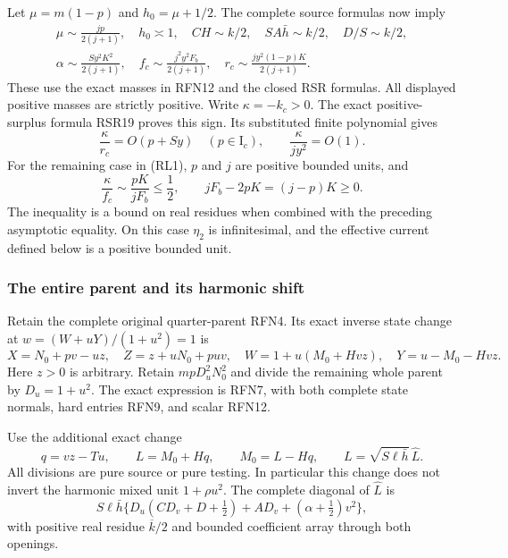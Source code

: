 Let \(\mu=m(1-p)\) and \(h_0=\mu+1/2\).
The complete source formulas now imply
\[
\begin{gathered}
 \mu\sim\frac{jp}{2(j+1)},\quad h_0\asymp1,\quad
 CH\sim k/2,\quad SA\bar h\sim k/2,\quad D/S\sim k/2,\\
 \alpha\sim\frac{Sy^2K^2}{2(j+1)},\quad
 f_c\sim\frac{j^2y^2F_b}{2(j+1)},\quad
 r_c\sim\frac{jy^2(1-p)K}{2(j+1)} .
\end{gathered}                                                   \tag{RL7}
\]
These use the exact masses in RFN12 and the closed RSR formulas.
All displayed positive masses are strictly positive.
Write \(\kappa=-k_c>0\).  The exact positive-surplus formula
RSR19 proves this sign.  Its substituted finite polynomial gives
\[
 \frac{\kappa}{r_c}=O(p+Sy)\quad(p\in\mathrm I_c),\qquad
 \frac{\kappa}{jy^2}=O(1).                              \tag{RL8}
\]
For the remaining case in (RL1), \(p\) and \(j\) are positive
bounded units, and
\[
 \frac{\kappa}{f_c}\sim\frac{pK}{jF_b}\leq\frac12,
 \qquad jF_b-2pK=(j-p)K\geq0.                          \tag{RL9}
\]
The inequality is a bound on real residues when combined with
the preceding asymptotic equality.  On this case \(\eta_2\) is
infinitesimal, and the effective current defined below is a
positive bounded unit.

\subsubsection*{The entire parent and its harmonic shift}

Retain the complete original quarter-parent RFN4.  Its exact inverse
state change at \(w=(W+uY)/(1+u^2)=1\) is
\[
 X=N_0+pv-uz,\quad Z=z+uN_0+puv,\quad
 W=1+u(M_0+Hvz),\quad Y=u-M_0-Hvz.                    \tag{RL10}
\]
Here \(z>0\) is arbitrary.  Retain \(mpD_u^2N_0^2\) and divide
the remaining whole parent by \(D_u=1+u^2\).
The exact expression is RFN7, with both complete state normals,
hard entries RFN9, and scalar RFN12.

Use the additional exact change
\[
 q=vz-Tu,\qquad L=M_0+Hq,\qquad
 M_0=L-Hq,\qquad L=\sqrt{S\ell\bar h}\,\widehat L .
                                                               \tag{RL11}
\]
All divisions are pure source or pure testing.  In particular
this change does not invert the harmonic mixed unit
\(1+\rho u^2\).
The complete diagonal of \(\widehat L\) is
\[
 S\ell\bar h\{D_u(CD_v+D+\tfrac12)+AD_v+
                   (\alpha+\tfrac12)v^2\},
                                                               \tag{RL12}
\]
with positive real residue \(\overline k/2\) and bounded
coefficient array through both openings.

